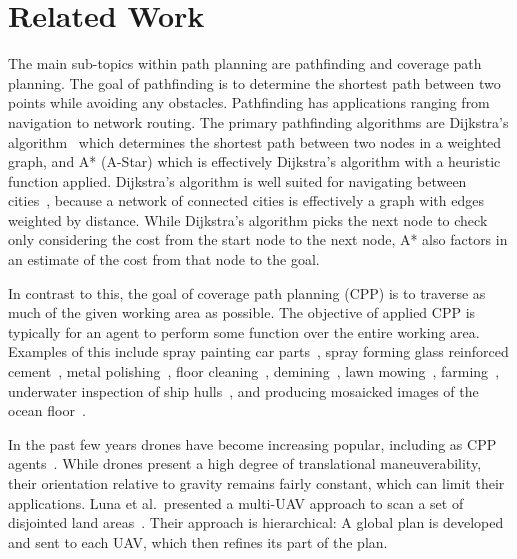 \chapter{Related Work}

The main sub-topics within path planning are pathfinding and coverage path planning.
The goal of pathfinding is to determine the shortest path between two points while avoiding any obstacles.
Pathfinding has applications ranging from navigation to network routing.
The primary pathfinding algorithms are Dijkstra's algorithm~\cite{Dijkstra, Improved_Dijkstra} which determines the shortest path between two nodes in a weighted graph, and A* (A-Star)\cite{A_Star_lit_review, A_Star_beginners, A_Star_in_computer_games} which is effectively Dijkstra's algorithm with a heuristic function applied.
Dijkstra's algorithm is well suited for navigating between cities~\cite{Dijkstra_for_railroads}, because a network of connected cities is effectively a graph with edges weighted by distance.
While Dijkstra's algorithm picks the next node to check only considering the cost from the start node to the next node, A* also factors in an estimate of the cost from that node to the goal.

In contrast to this, the goal of coverage path planning (CPP) is to traverse as much of the given working area as possible.
The objective of applied CPP is typically for an agent to perform some function over the entire working area.
Examples of this include spray painting car parts~\cite{Automatic_spray_painting_path}, spray forming glass reinforced cement~\cite{Robotic_grc_spraying}, metal polishing~\cite{Metal_polishing_robot_sys}, floor cleaning~\cite{CCPP_guidance_for_cleaning_robots}, demining~\cite{CPP_demining}, lawn mowing~\cite{CPP_autonomous_lawn_mower}, farming~\cite{Vision_perception_auto_harvester, CPP_alg_agriculture}, underwater inspection of ship hulls~\cite{CPP_inspect_complex_structures}, and producing mosaicked images of the ocean floor~\cite{Terrain_covering_AUV}.

In the past few years drones have become increasing popular, including as CPP agents~\cite{CPP_UAV_survey, CPP_2D_convex_regions_uav, CPP_multi_UAV, CPP_spraying_drones}.
While drones present a high degree of translational maneuverability, their orientation relative to gravity remains fairly constant, which can limit their applications.
Luna et al.\ presented a multi-UAV approach to scan a set of disjointed land areas~\cite{CPP_multi_UAV}.
Their approach is hierarchical: A global plan is developed and sent to each UAV, which then refines its part of the plan.

